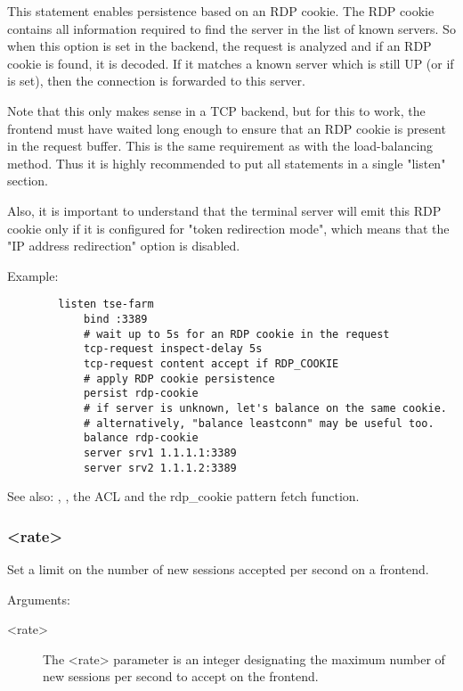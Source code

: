 {  This statement enables persistence based on an RDP cookie. The RDP cookie
  contains all information required to find the server in the list of known
  servers. So when this option is set in the backend, the request is analyzed
  and if an RDP cookie is found, it is decoded. If it matches a known server
  which is still UP (or if  is set), then the connection is
  forwarded to this server.

  Note that this only makes sense in a TCP backend, but for this to work, the
  frontend must have waited long enough to ensure that an RDP cookie is present
  in the request buffer. This is the same requirement as with the 
  load-balancing method. Thus it is highly recommended to put all statements in
  a single "listen" section.

  Also, it is important to understand that the terminal server will emit this
  RDP cookie only if it is configured for "token redirection mode", which means
  that the "IP address redirection" option is disabled.

  Example:
  \begin{verbatim}
        listen tse-farm
            bind :3389
            # wait up to 5s for an RDP cookie in the request
            tcp-request inspect-delay 5s
            tcp-request content accept if RDP_COOKIE
            # apply RDP cookie persistence
            persist rdp-cookie
            # if server is unknown, let's balance on the same cookie.
            # alternatively, "balance leastconn" may be useful too.
            balance rdp-cookie
            server srv1 1.1.1.1:3389
            server srv2 1.1.1.2:3389
  \end{verbatim}

  See also: , , the  ACL and
  the rdp\_cookie pattern fetch function.

\subsubsection[rate-limit sessions]{ <rate>}

  Set a limit on the number of new sessions accepted per second on a frontend.


  Arguments:
  \begin{description}
  \item[<rate>] The <rate> parameter is an integer designating the maximum number
              of new sessions per second to accept on the frontend.
  \end{description}
  
}
